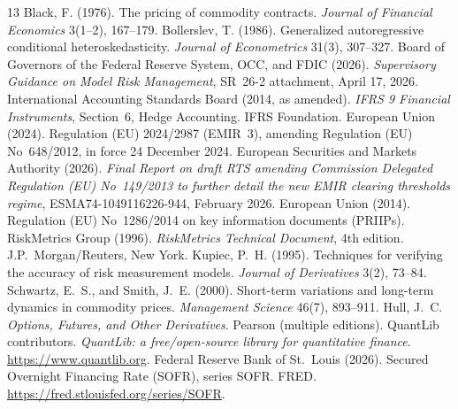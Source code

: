 \documentclass[11pt,a4paper]{article}
\begin{document}
\begin{thebibliography}{13}
 Black, F. (1976). The pricing of commodity contracts.
\emph{Journal of Financial Economics} 3(1--2), 167--179.
 Bollerslev, T. (1986). Generalized autoregressive
conditional heteroskedasticity. \emph{Journal of Econometrics} 31(3),
307--327.
 Board of Governors of the Federal Reserve System, OCC, and
FDIC (2026). \emph{Supervisory Guidance on Model Risk Management},
SR~26-2 attachment, April 17, 2026.
 International Accounting Standards Board (2014, as
amended). \emph{IFRS 9 Financial Instruments}, Section~6, Hedge
Accounting. IFRS Foundation.
 European Union (2024). Regulation (EU) 2024/2987 (EMIR~3),
amending Regulation (EU) No~648/2012, in force 24 December 2024.
 European Securities and Markets Authority (2026).
\emph{Final Report on draft RTS amending Commission Delegated Regulation
(EU) No~149/2013 to further detail the new EMIR clearing thresholds
regime}, ESMA74-1049116226-944, February 2026.
 European Union (2014). Regulation (EU) No~1286/2014 on
key information documents (PRIIPs).
 RiskMetrics Group (1996). \emph{RiskMetrics
Technical Document}, 4th edition. J.P.~Morgan/Reuters, New York.
 Kupiec, P.~H. (1995). Techniques for verifying the
accuracy of risk measurement models. \emph{Journal of Derivatives}
3(2), 73--84.
 Schwartz, E.~S., and Smith, J.~E. (2000).
Short-term variations and long-term dynamics in commodity prices.
\emph{Management Science} 46(7), 893--911.
 Hull, J.~C. \emph{Options, Futures, and Other Derivatives}.
Pearson (multiple editions).
 QuantLib contributors. \emph{QuantLib: a free/open-source
library for quantitative finance}. \url{https://www.quantlib.org}.
 Federal Reserve Bank of St.\ Louis (2026). Secured
Overnight Financing Rate (SOFR), series SOFR. FRED.
\url{https://fred.stlouisfed.org/series/SOFR}.
\end{thebibliography}
\end{document}
